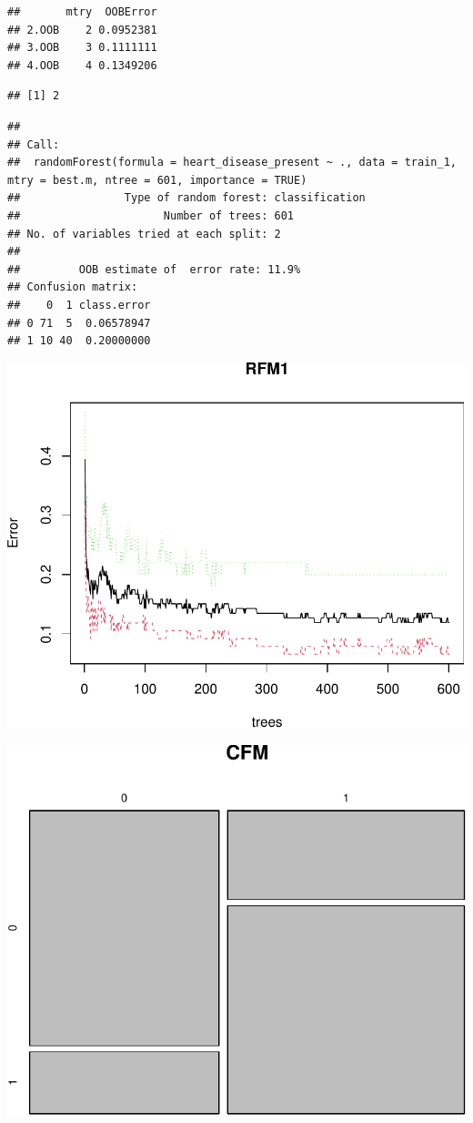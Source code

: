 \documentclass[11pt,preprint, authoryear]{elsarticle}
\numberwithin{equation}{section}
\numberwithin{figure}{section}
\numberwithin{table}{section}
\begin{document}
\begin{verbatim}
##       mtry  OOBError
## 2.OOB    2 0.0952381
## 3.OOB    3 0.1111111
## 4.OOB    4 0.1349206
\end{verbatim}

\begin{verbatim}
## [1] 2
\end{verbatim}

\begin{verbatim}
## 
## Call:
##  randomForest(formula = heart_disease_present ~ ., data = train_1,      mtry = best.m, ntree = 601, importance = TRUE) 
##                Type of random forest: classification
##                      Number of trees: 601
## No. of variables tried at each split: 2
## 
##         OOB estimate of  error rate: 11.9%
## Confusion matrix:
##    0  1 class.error
## 0 71  5  0.06578947
## 1 10 40  0.20000000
\end{verbatim}

\includegraphics{ML_project_files/figure-latex/unnamed-chunk-10-1.pdf}

\includegraphics{ML_project_files/figure-latex/unnamed-chunk-12-1.pdf}
\end{document}
